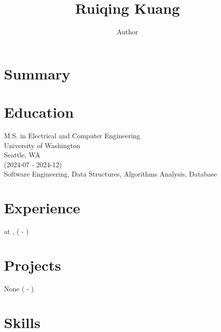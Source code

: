 \documentclass{article}%
\title{Ruiqing Kuang}%
\author{Author}%
\begin{document}
%
\normalsize%
\maketitle%
\section{Summary}%
\label{sec:Summary}%

%
\section{Education}%
\label{sec:Education}%
M.S. in Electrical and Computer Engineering \\ %
University of Washington \\ %
Seattle, WA \\ %
(2024-07 - 2024-12) \\ %
Software Engineering, Data Structures, Algorithms Analysis, Database \\ 

%
\section{Experience}%
\label{sec:Experience}%
 at ,  ( {-} )

%
\section{Projects}%
\label{sec:Projects}%
None ( {-} )

%
\section{Skills}%
\label{sec:Skills}%

%
\end{document}
